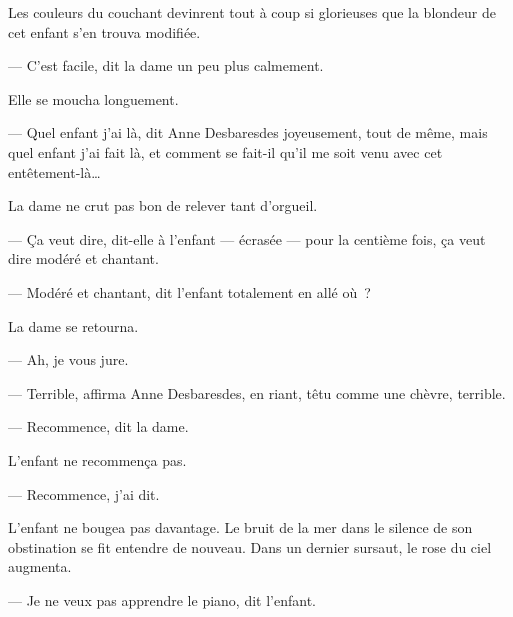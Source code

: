 {Les couleurs du couchant devinrent tout à coup si glorieuses que la blondeur de cet enfant s'en trouva modifiée.

--- C'est facile, dit la dame un peu plus calmement.

Elle se moucha longuement.

--- Quel enfant j'ai là, dit Anne Desbaresdes joyeusement, tout de même, mais quel enfant j'ai fait là, et comment se fait-il qu'il me soit venu avec cet entêtement-là…

La dame ne crut pas bon de relever tant d'orgueil.

--- Ça veut dire, dit-elle à l'enfant — écrasée — pour la centième fois, ça veut dire modéré et chantant.

--- Modéré et chantant, dit l'enfant totalement en allé où~?

La dame se retourna.

--- Ah, je vous jure.

--- Terrible, affirma Anne Desbaresdes, en riant, têtu comme une chèvre, terrible.

--- Recommence, dit la dame.

L'enfant ne recommença pas.

--- Recommence, j'ai dit.

L'enfant ne bougea pas davantage. Le bruit de la mer dans le silence de son obstination se fit entendre de nouveau. Dans un dernier sursaut, le rose du ciel augmenta.

--- Je ne veux pas apprendre le piano, dit l'enfant.

}


